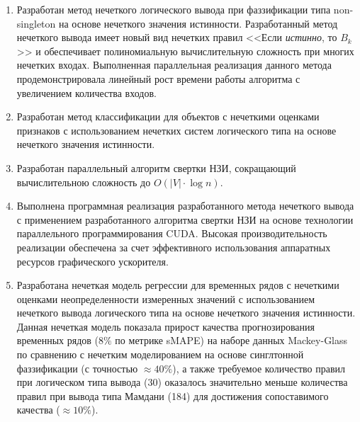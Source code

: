 {}
\begin{enumerate}[beginpenalty=10000] %
  \item Разработан метод нечеткого логического вывода при фаззификации типа non-singleton на основе нечеткого значения истинности. Разработанный метод нечеткого вывода имеет новый вид нечетких правил <<Если \textit{истинно}, то $B_k$>> и обеспечивает полиномиальную вычислительную сложность при многих нечетких входах. Выполненная параллельная реализация данного метода продемонстрировала линейный рост времени работы алгоритма с увеличением количества входов.
 
  \item Разработан метод классификации для объектов с нечеткими оценками признаков с использованием нечетких систем логического типа на основе нечеткого значения истинности.
  
  \item Разработан параллельный алгоритм свертки НЗИ, сокращающий вычислительною сложность до $O(|V|\cdot \log{n})$.

  \item Выполнена программная реализация разработанного метода нечеткого вывода с применением разработанного алгоритма свертки НЗИ на основе технологии параллельного программирования CUDA. Высокая производительность реализации обеспечена за счет эффективного использования аппаратных ресурсов графического ускорителя.
  
  \item Разработана нечеткая модель регрессии для временных рядов с нечеткими оценками неопределенности измеренных значений с использованием нечеткого вывода логического типа на основе нечеткого значения истинности. Данная нечеткая модель показала прирост качества прогнозирования временных рядов ($8\%$ по метрике sMAPE) на наборе данных Mackey-Glass по сравнению с нечетким моделированием на основе синглтонной фаззификации (с точностью $\approx 40\%$), а также требуемое количество правил при логическом типа вывода (30) оказалось значительно меньше количества правил при вывода типа Мамдани (184) для достижения сопоставимого качества ($\approx 10\%$).
  
\end{enumerate}

